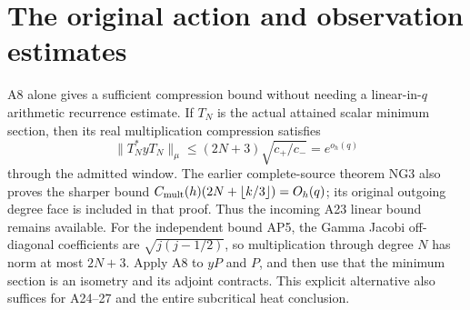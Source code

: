 \documentclass[11pt]{article}
\begin{document}
\section{The original action and observation estimates}
A8 alone gives a sufficient compression bound without needing a
linear-in-\(q\) arithmetic recurrence estimate. If \(T_N\) is the
actual attained scalar minimum section, then its real multiplication
compression satisfies
\begin{equation}\tag{AP5}
\|T_N^*yT_N\|_\mu
\le (2N+3)\sqrt{c_+/c_-}=e^{o_h(q)}
\end{equation}
through the admitted window. The earlier complete-source theorem
NG3 \cite{APNG} also proves the sharper bound
\(C_{\rm mult}(h)(2N+\lfloor k/3\rfloor)=O_h(q)\);
its original outgoing degree face is included in that proof.
Thus the incoming A23 linear bound remains available.
For the independent bound AP5, the Gamma Jacobi off-diagonal
coefficients are \(\sqrt{j(j-1/2)}\), so multiplication through degree
\(N\) has norm at most \(2N+3\). Apply A8 to \(yP\) and \(P\), and
then use that the minimum section is an isometry and its adjoint
contracts. This explicit alternative also suffices for A24--27 and
the entire subcritical heat conclusion.
\end{document}
